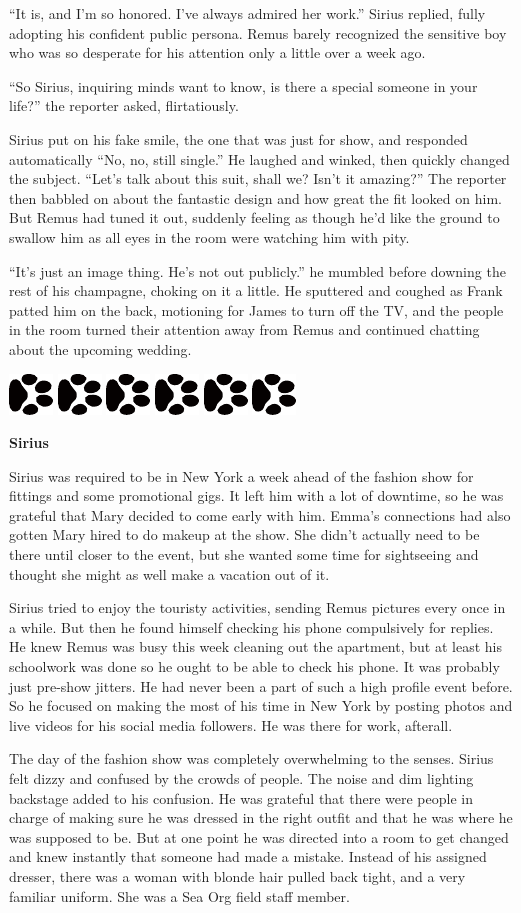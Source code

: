 \documentclass[12pt,twoside,openright]{memoir}
\newcommand{\myrulez}{	
	\begin{center}
		\hspace{.5em}
		\includegraphics[angle=60]{dogprint.pdf}
		\hspace{.5em}
		\includegraphics[angle=120]{dogprint.pdf}
		\hspace{.5em}
		\includegraphics[angle=60]{dogprint.pdf}
		\hspace{.5em}
		\includegraphics[angle=120]{dogprint.pdf}
		\hspace{.5em}
		\includegraphics[angle=60]{dogprint.pdf}
		\hspace{.5em}
		\includegraphics[angle=120]{dogprint.pdf}
		\hspace{.5em}
	\end{center}
}
\begin{document}
``It is, and I'm so honored. I've always admired her work.'' Sirius replied, fully adopting his confident public persona. Remus barely recognized the sensitive boy who was so desperate for his attention only a little over a week ago. 

``So Sirius, inquiring minds want to know, is there a special someone in your life?'' the reporter asked, flirtatiously. 

Sirius put on his fake smile, the one that was just for show, and responded automatically ``No, no, still single.'' He laughed and winked, then quickly changed the subject. ``Let's talk about this suit, shall we? Isn't it amazing?'' The reporter then babbled on about the fantastic design and how great the fit looked on him. But Remus had tuned it out, suddenly feeling as though he'd like the ground to swallow him as all eyes in the room were watching him with pity.

``It's just an image thing. He's not out publicly.'' he mumbled before downing the rest of his champagne, choking on it a little. He sputtered and coughed as Frank patted him on the back, motioning for James to turn off the TV, and the people in the room turned their attention away from Remus and continued chatting about the upcoming wedding. 

\myrulez

\textbf{Sirius} 

Sirius was required to be in New York a week ahead of the fashion show for fittings and some promotional gigs. It left him with a lot of downtime, so he was grateful that Mary decided to come early with him. Emma's connections had also gotten Mary hired to do makeup at the show. She didn't actually need to be there until closer to the event, but she wanted some time for sightseeing and thought she might as well make a vacation out of it. 

Sirius tried to enjoy the touristy activities, sending Remus pictures every once in a while. But then he found himself checking his phone compulsively for replies. He knew Remus was busy this week cleaning out the apartment, but at least his schoolwork was done so he ought to be able to check his phone. It was probably just pre-show jitters. He had never been a part of such a high profile event before. So he focused on making the most of his time in New York by posting photos and live videos for his social media followers. He was there for work, afterall.

The day of the fashion show was completely overwhelming to the senses. Sirius felt dizzy and confused by the crowds of people. The noise and dim lighting backstage added to his confusion. He was grateful that there were people in charge of making sure he was dressed in the right outfit and that he was where he was supposed to be. But at one point he was directed into a room to get changed and knew instantly that someone had made a mistake. Instead of his assigned dresser, there was a woman with blonde hair pulled back tight, and a very familiar uniform. She was a Sea Org field staff member. 
\end{document}
